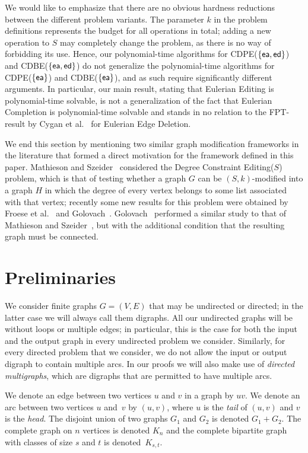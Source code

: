 \documentclass[11pt]{llncs}
\newcommand{\ed}{{\sf ed}}
\newcommand{\ea}{{\sf ea}}
\newcommand{\cdpe}{{\sc CDPE}}
\newcommand{\cdbe}{{\sc CDBE}}
\newcommand{\FPT}{{\sf FPT}}
\begin{document}
We would like to emphasize that there are no obvious hardness reductions between the different problem variants. The parameter $k$ in the problem definitions represents the budget for all operations in total; adding a new operation to $S$ may completely change the problem, as there is no way of forbidding its use. Hence, our polynomial-time algorithms for \cdpe($\{\ea,\ed\}$) and \cdbe($\{\ea,\ed\}$) do not generalize the polynomial-time algorithms for \cdpe($\{\ea\}$) and \cdbe($\{\ea\}$), and as such require significantly different arguments. In particular, our main result, stating that {\sc Eulerian Editing} is polynomial-time solvable, is not a generalization of the fact that {\sc Eulerian Completion} is polynomial-time solvable and stands in no relation to the \FPT-result by Cygan et al.~\cite{CyganMPPS14} for {\sc Eulerian Edge Deletion}.

\medskip
\noindent
We end this section by mentioning two similar graph modification frameworks in the literature that formed a direct motivation for the framework defined in this paper.
Mathieson and Szeider~\cite{MathiesonS12} considered the {\sc Degree Constraint Editing($S$)} problem, which is that of testing whether a graph $G$ can be $(S,k)$-modified into a graph $H$ in which the degree of every vertex belongs to some list associated with that vertex;
recently some new results for this problem were obtained by Froese et al.~\cite{FroeseNN14} and Golovach~\cite{Golovach13a}.
Golovach~\cite{Golovach13} performed a similar study to that of Mathieson and Szeider~\cite{MathiesonS12}, but with the additional condition that the resulting graph must be connected.

\section{Preliminaries}\label{sec:prelim}

We consider finite graphs $G=(V,E)$ that may be undirected or directed; in the
latter case we will always call them digraphs. All our undirected graphs will
be without loops or multiple edges; in particular, this is the case for both the input and the output graph in every undirected problem we consider. 
Similarly, for every directed problem that we consider, we do not allow the input or output digraph to contain multiple arcs.
In our proofs we will also make use of {\em directed multigraphs}, which are digraphs that are permitted to have multiple arcs.

We denote an edge between two vertices $u$ and $v$ in a graph by $uv$.  We denote an arc between
two vertices $u$ and~$v$ by $(u,v)$, where $u$ is the \emph{tail} of $(u,v)$
and $v$ is the \emph{head}. The disjoint union of two graphs $G_1$ and $G_2$ is denoted $G_1+G_2$.
The complete graph on $n$ vertices is denoted $K_n$ and the complete bipartite graph with classes of size $s$ and $t$
is denoted~$K_{s,t}$.
\end{document}
